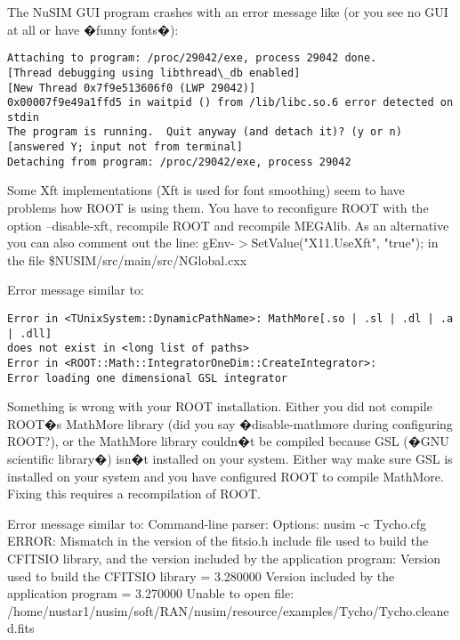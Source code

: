 The NuSIM GUI program crashes with an error message like (or you see no GUI at all or have �funny fonts�):
{\scriptsize \begin{verbatim}
Attaching to program: /proc/29042/exe, process 29042 done.
[Thread debugging using libthread\_db enabled]
[New Thread 0x7f9e513606f0 (LWP 29042)]
0x00007f9e49a1ffd5 in waitpid () from /lib/libc.so.6 error detected on stdin
The program is running.  Quit anyway (and detach it)? (y or n) [answered Y; input not from terminal]
Detaching from program: /proc/29042/exe, process 29042
\end{verbatim}}


Some Xft implementations (Xft is used for font smoothing) seem to have problems how ROOT is using them. You have to reconfigure ROOT with the option --disable-xft, recompile ROOT and recompile MEGAlib.
As an alternative you can also comment out the line:
gEnv-$>$SetValue("X11.UseXft", "true");
in the file \$NUSIM/src/main/src/NGlobal.cxx


Error message similar to:
{\scriptsize \begin{verbatim}
Error in <TUnixSystem::DynamicPathName>: MathMore[.so | .sl | .dl | .a | .dll] 
does not exist in <long list of paths>
Error in <ROOT::Math::IntegratorOneDim::CreateIntegrator>: 
Error loading one dimensional GSL integrator
\end{verbatim}
}

Something is wrong with your ROOT installation. Either you did not compile ROOT�s MathMore library (did you say �disable-mathmore during configuring ROOT?), or the MathMore library couldn�t be compiled because GSL (�GNU scientific library�) isn�t installed on your system. Either way make sure GSL is installed on your system and you have configured ROOT to compile MathMore. Fixing this requires a recompilation of ROOT.


Error message similar to:
Command-line parser: Options: nusim -c Tycho.cfg 
ERROR: Mismatch in the version of the fitsio.h include file used to build
the CFITSIO library, and the version included by the application program:
   Version used to build the CFITSIO library   = 3.280000
   Version included by the application program = 3.270000
Unable to open file: 
/home/nustar1/nusim/soft/RAN/nusim/resource/examples/Tycho/Tycho.cleaned.fits

